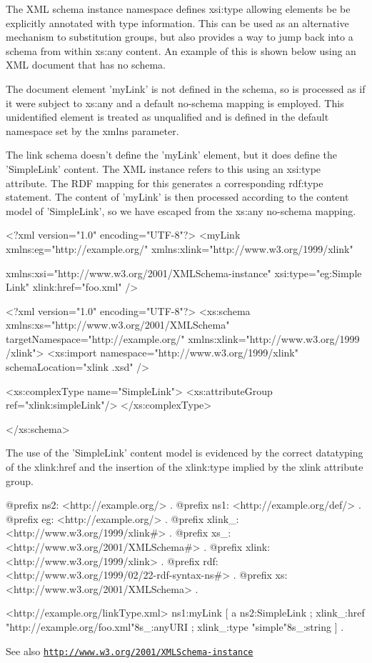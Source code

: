 The XML schema instance namespace defines xsi:type allowing elements be be explicitly annotated with type information. This can be used as an alternative mechanism to substitution groups, but also provides a way to jump back into a schema from within xs:any content. An example of this is shown below using an XML document that has no schema.

The document element 'myLink' is not defined in the schema, so is processed as if it were subject to xs:any and a default no-\/schema mapping is employed. This unidentified element is treated as unqualified and is defined in the default namespace set by the xmlns parameter.

The link schema doesn't define the 'myLink' element, but it does define the 'SimpleLink' content. The XML instance refers to this using an xsi:type attribute. The RDF mapping for this generates a corresponding rdf:type statement. The content of 'myLink' is then processed according to the content model of 'SimpleLink', so we have escaped from the xs:any no-\/schema mapping.


\begin{DoxyCodeInclude}
<?xml version="1.0" encoding="UTF-8"?>
<myLink xmlns:eg="http://example.org/" xmlns:xlink="http://www.w3.org/1999/xlink"
      
        xmlns:xsi="http://www.w3.org/2001/XMLSchema-instance" xsi:type="eg:Simple
      Link"
        xlink:href="foo.xml" />

\end{DoxyCodeInclude}
 
\begin{DoxyCodeInclude}
<?xml version="1.0" encoding="UTF-8"?>
<xs:schema xmlns:xs="http://www.w3.org/2001/XMLSchema"
        targetNamespace="http://example.org/" xmlns:xlink="http://www.w3.org/1999
      /xlink">
        <xs:import namespace="http://www.w3.org/1999/xlink" schemaLocation="xlink
      .xsd" />

        <xs:complexType name="SimpleLink">
                <xs:attributeGroup ref="xlink:simpleLink"/>
        </xs:complexType>

</xs:schema>
\end{DoxyCodeInclude}


The use of the 'SimpleLink' content model is evidenced by the correct datatyping of the xlink:href and the insertion of the xlink:type implied by the xlink attribute group.


\begin{DoxyCodeInclude}
@prefix ns2:     <http://example.org/> .
@prefix ns1:     <http://example.org/def/> .
@prefix eg:      <http://example.org/> .
@prefix xlink_:  <http://www.w3.org/1999/xlink#> .
@prefix xs_:     <http://www.w3.org/2001/XMLSchema#> .
@prefix xlink:   <http://www.w3.org/1999/xlink> .
@prefix rdf:     <http://www.w3.org/1999/02/22-rdf-syntax-ns#> .
@prefix xs:      <http://www.w3.org/2001/XMLSchema> .

<http://example.org/linkType.xml>
      ns1:myLink
              [ a       ns2:SimpleLink ;
                xlink_:href "http://example.org/foo.xml"^^xs_:anyURI ;
                xlink_:type "simple"^^xs_:string
              ] .
\end{DoxyCodeInclude}


\begin{DoxySeeAlso}{See also}
\href{http://www.w3.org/2001/XMLSchema-instance}{\tt http://www.w3.org/2001/XMLSchema-\/instance} 
\end{DoxySeeAlso}
